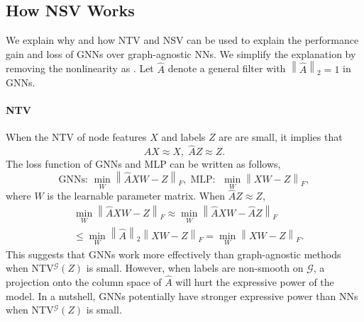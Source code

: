 \documentclass{article}
\newcommand{\norm}[1]{\left\lVert#1\right\rVert}
\newcommand{\0}{{\boldsymbol{0}}}
\newcommand{\6}{{\partial}}
\newcommand{\8}{{\infty}}
\newcommand{\4}{{\nabla}}
\providecommand{\norm}[1]{\lVert#1\rVert}
\begin{document}
\subsection{How NSV Works}
We explain why and how NTV and NSV can be used to explain the performance gain and loss of GNNs over graph-agnostic NNs. We simplify the explanation by removing the nonlinearity as \cite{wu2019simplifying}. Let $\hat{A}$ denote a general filter with $\norm{\hat{A}}_2 = 1$ in GNNs.
\paragraph{NTV} When the NTV of node features $X$ and labels $Z$ are are small, it implies that
\begin{equation} \label{eq:ntv_small_implication}
    \hat{A} X \approx X, \; \hat{A} Z \approx Z.
\end{equation}
The loss function of GNNs and MLP can be written as follows,
\begin{equation}
    \text{GNNs: } \min_W \norm{\hat{A}XW-Z}_F ,\; \text{MLP: } \; \min_W \norm{XW-Z}_F,
\end{equation}
where $W$ is the learnable parameter matrix. When $\hat{A} Z \approx Z$,
\begin{equation}
\begin{aligned}
 &\min_W \norm{\hat{A}XW-Z}_F \approx \min_W \norm{\hat{A}XW-\hat{A}Z}_F \\
 & \leq \min_W \norm{\hat{A}}_2 \norm{XW-Z}_F =\min_W  \norm{XW-Z}_F.
\end{aligned}
\end{equation}
This suggests that GNNs work more effectively than graph-agnostic methods when NTV$^\mathcal{G}(Z)$ is small. However, when labels are non-smooth on $\mathcal{G}$, a projection onto the column space of $\hat{A}$  will hurt the expressive power of the model. In a nutshell, GNNs potentially have stronger expressive power than NNs when NTV$^\mathcal{G}(Z)$ is small.
\end{document}
